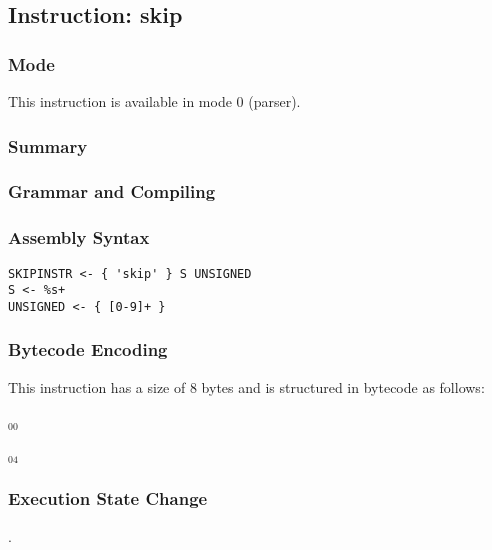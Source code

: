\subsection{Instruction: skip}

\subsubsection{Mode}
This instruction is available in mode 0 (parser).
\subsubsection{Summary}


\subsubsection{Grammar and Compiling}


\subsubsection{Assembly Syntax}

\begin{myquote}
\begin{verbatim}
SKIPINSTR <- { 'skip' } S UNSIGNED
S <- %s+
UNSIGNED <- { [0-9]+ }
\end{verbatim}
\end{myquote}

\subsubsection{Bytecode Encoding}

This instruction has a size of 8 bytes and is structured in bytecode as follows:

$_{00}$\ 



$_{04}$\ 


\subsubsection{Execution State Change}

.


